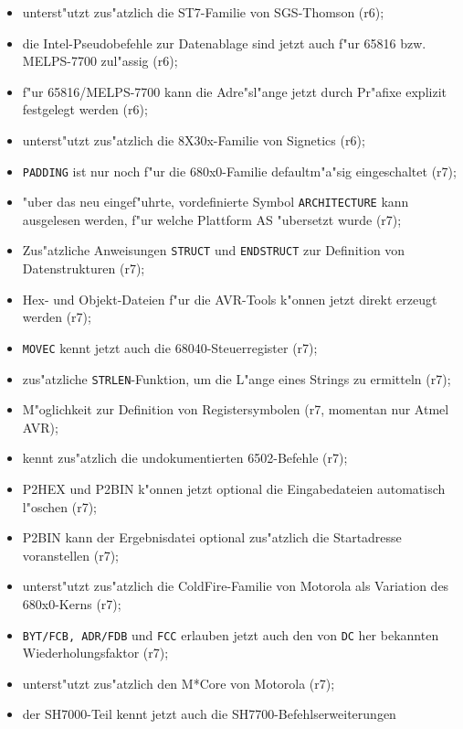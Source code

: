 \documentclass[12pt,a4paper,twoside]{report}
\newcommand{\tty}[1]{{\tt #1}}
\begin{document}
\begin{itemize}
{\begin{itemize}
      \item{unterst"utzt zus"atzlich die ST7-Familie von SGS-Thomson (r6);}
      \item{die Intel-Pseudobefehle zur Datenablage sind jetzt
            auch f"ur 65816 bzw. MELPS-7700 zul"assig (r6);}
      \item{f"ur 65816/MELPS-7700 kann die Adre"sl"ange jetzt durch
            Pr"afixe explizit festgelegt werden (r6);}
      \item{unterst"utzt zus"atzlich die 8X30x-Familie von Signetics
            (r6);}
      \item{\tty{PADDING} ist nur noch f"ur die 680x0-Familie defaultm"a"sig
            eingeschaltet (r7);}
      \item{"uber das neu eingef"uhrte, vordefinierte Symbol
            \tty{ARCHITECTURE} kann ausgelesen werden, f"ur welche
            Plattform AS "ubersetzt wurde (r7);}
      \item{Zus"atzliche Anweisungen \tty{STRUCT} und \tty{ENDSTRUCT} zur
            Definition von Datenstrukturen (r7);}
      \item{Hex- und Objekt-Dateien f"ur die AVR-Tools k"onnen jetzt
            direkt erzeugt werden (r7);}
      \item{\tty{MOVEC} kennt jetzt auch die 68040-Steuerregister (r7);}
      \item{zus"atzliche \tty{STRLEN}-Funktion, um die L"ange eines
            Strings zu ermitteln (r7);}
      \item{M"oglichkeit zur Definition von Registersymbolen (r7, momentan
            nur Atmel AVR);}
      \item{kennt zus"atzlich die undokumentierten 6502-Befehle (r7);}
      \item{P2HEX und P2BIN k"onnen jetzt optional die Eingabedateien
            automatisch l"oschen (r7);}
      \item{P2BIN kann der Ergebnisdatei optional zus"atzlich die
            Startadresse voranstellen (r7);}
      \item{unterst"utzt zus"atzlich die ColdFire-Familie von Motorola als
            Variation des 680x0-Kerns (r7);}
      \item{\tty{BYT/FCB, ADR/FDB} und \tty{FCC} erlauben jetzt auch den
            von \tty{DC} her bekannten Wiederholungsfaktor (r7);}
      \item{unterst"utzt zus"atzlich den M*Core von Motorola (r7);}
      \item{der SH7000-Teil kennt jetzt auch die SH7700-Befehlserweiterungen
}
\end{itemize}}
\end{itemize}
\end{document}
